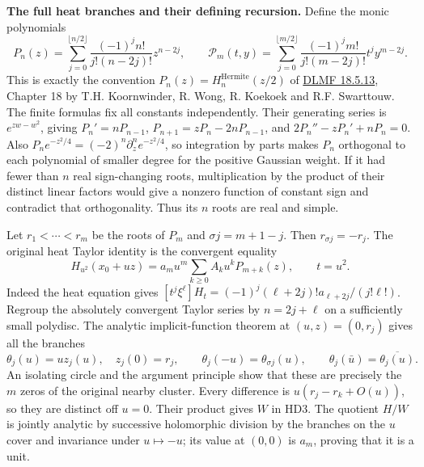 \HD\textbf{The full heat branches and their defining recursion.}
Define the monic polynomials
\[
 P_n(z)=\sum_{j=0}^{\lfloor n/2\rfloor}
      \frac{(-1)^jn!}{j!(n-2j)!}z^{n-2j},\qquad
 \mathcal P_m(t,y)=
      \sum_{j=0}^{\lfloor m/2\rfloor}
       \frac{(-1)^jm!}{j!(m-2j)!}t^jy^{m-2j}.
 \tag{HD5}\label{hd:hermite}
\]
This is exactly the convention
$P_n(z)=H_n^{\mathrm{Hermite}}(z/2)$ of
\href{https://dlmf.nist.gov/18.5.E13}{DLMF 18.5.13},
Chapter 18 by T.H. Koornwinder, R. Wong, R. Koekoek and
R.F. Swarttouw. The finite formulas fix all constants independently.
Their generating series is $e^{zw-w^2}$, giving
$P_n'=nP_{n-1}$,
$P_{n+1}=zP_n-2nP_{n-1}$, and
$2P_n''-zP_n'+nP_n=0$.
Also $P_ne^{-z^2/4}=(-2)^n\partial_z^n e^{-z^2/4}$, so integration
by parts makes $P_n$ orthogonal to each polynomial of smaller
degree for the positive Gaussian weight. If it had fewer than
$n$ real sign-changing roots, multiplication by the product of
their distinct linear factors would give a nonzero function of
constant sign and contradict that orthogonality. Thus its $n$
roots are real and simple.

Let $r_1<\cdots<r_m$ be the roots of $P_m$ and
$\sigma j=m+1-j$. Then $r_{\sigma j}=-r_j$.
The original heat Taylor identity is the convergent equality
\[
 H_{u^2}(x_0+uz)
       =a_mu^m\sum_{k\ge0}A_k u^kP_{m+k}(z),\qquad t=u^2.
 \tag{HD6}\label{hd:fullseries}
\]
Indeed the heat equation gives
$[t^j\xi^\ell]H_t=(-1)^j(\ell+2j)!a_{\ell+2j}/(j!\ell!)$.
Regroup the absolutely convergent Taylor series by $n=2j+\ell$
on a sufficiently small polydisc.
The analytic implicit-function theorem at $(u,z)=(0,r_j)$ gives
all the branches
\[
 \theta_j(u)=u z_j(u),\quad z_j(0)=r_j,\qquad
 \theta_j(-u)=\theta_{\sigma j}(u),\qquad
 \theta_j(\bar u)=\overline{\theta_j(u)} .
 \tag{HD7}
\]
An isolating circle and the argument principle show that these
are precisely the $m$ zeros of the original nearby cluster.
Every difference is $u(r_j-r_k+O(u))$, so they are distinct off
$u=0$. Their product gives $W$ in HD3.
The quotient $H/W$ is jointly analytic by successive holomorphic
division by the branches on the $u$ cover and invariance under
$u\mapsto-u$; its value at $(0,0)$ is $a_m$, proving that it is a unit.

